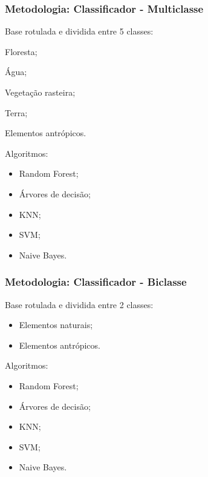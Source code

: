 \documentclass[t]{beamer}
\begin{document}
\begin{frame}[c]
	\frametitle{Metodologia: Classificador - Multiclasse}
	
	Base rotulada e dividida entre 5 classes:
	\vspace{0.3cm}
	\begin{itemize}
		\begin{minipage}{0.4\linewidth}
    		\item Floresta;
			\item Água;
			\item Vegetação rasteira;
		\end{minipage}
		\begin{minipage}{0.4\linewidth}
    		\item Terra;
			\item Elementos antrópicos.
		\end{minipage} 	
	\end{itemize}

	\vspace{0.5cm}
	
	Algoritmos:
	\begin{itemize}
		\item Random Forest;
		\item Árvores de decisão;
		\item KNN;
		\item SVM;
		\item Naive Bayes.
	\end{itemize}
\end{frame}

\begin{frame}[c]
	\frametitle{Metodologia: Classificador - Biclasse}

	Base rotulada e dividida entre 2 classes:
	\vspace{0.3cm}
	\begin{itemize}
    	\item Elementos naturais;
		\item Elementos antrópicos.
	\end{itemize}

	\vspace{0.5cm}

	Algoritmos:
	\begin{itemize}
		\item Random Forest;
		\item Árvores de decisão;
		\item KNN;
		\item SVM;
		\item Naive Bayes.
	\end{itemize}

\end{frame}
\end{document}

